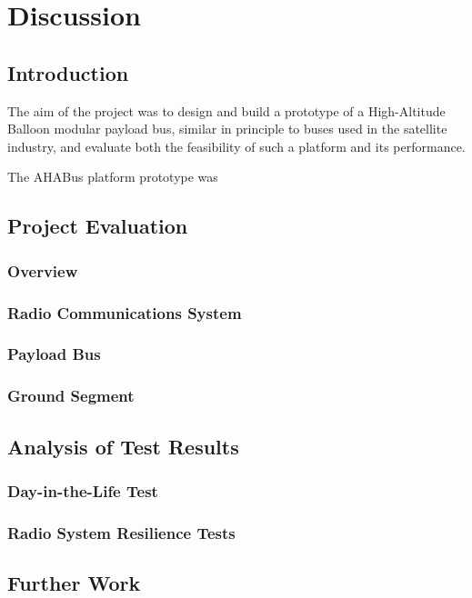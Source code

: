 \chapter{Discussion}
\label{ch:discussion}

\section{Introduction}

The aim of the project was to design and build a prototype of a High-Altitude
Balloon modular payload bus, similar in principle to buses used in the
satellite industry, and evaluate both the feasibility of such a platform and
its performance.

The AHABus platform prototype was 

\section{Project Evaluation}

\subsection{Overview}

\subsection{Radio Communications System}

\subsection{Payload Bus}

\subsection{Ground Segment}

\section{Analysis of Test Results}

\subsection{Day-in-the-Life Test}

\subsection{Radio System Resilience Tests}

\section{Further Work} %
